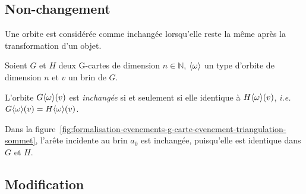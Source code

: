 

\subsection{Non-changement}
\label{sec:formalisation-evenements-transfo-objets-non-changement}

Une orbite est considérée comme inchangée lorsqu'elle reste la même après la
transformation d'un objet. %
\begin{definition}
	Soient $G$ et $H$ deux G-cartes de dimension $n \in \mathbb{N}$,
	$\langle\omega\rangle$ un type d'orbite de dimension $n$ et $v$ un brin de $G$.

	L'orbite $G\langle\omega\rangle(v)$ est \emph{inchangée} si et seulement si elle identique à $H\langle\omega\rangle(v)$, \textit{i.e.} $G\langle\omega\rangle(v) = H\langle\omega\rangle(v)$.
\end{definition}

Dans la figure~\ref{fig:formalisation-evenements-g-carte-evenement-triangulation-sommet}, l'arête incidente au brin $a_0$ est inchangée, puisqu'elle est identique dans $G$ et $H$. %





\subsection{Modification}
\label{sec:formalisation-evenements-transfo-objets-modification}

